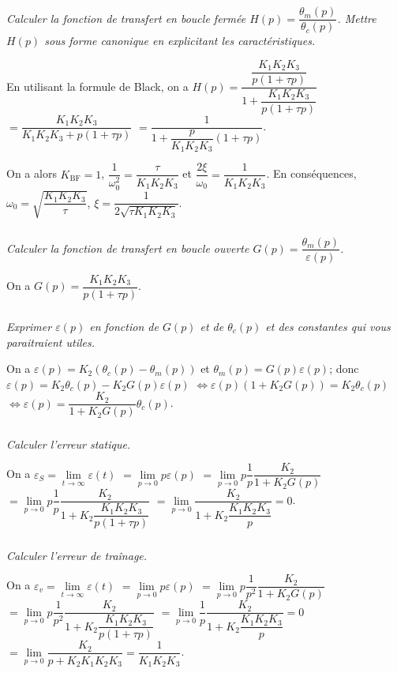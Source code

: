 \documentclass[10pt,fleqn]{article} %
\begin{document}
\subparagraph{\label{q}}\textit{Calculer la fonction de transfert en boucle fermée $H(p)=\dfrac{\theta_m(p)}{\theta_c(p)}$. Mettre $H(p)$ sous forme canonique en explicitant les caractéristiques.}
\ifprof
\begin{corrige}
En utilisant la formule de Black, on a 
$H(p)=\dfrac{\dfrac{K_1K_2K_3}{p\left(1+\tau p\right)}}{1+\dfrac{K_1K_2K_3}{p\left(1+\tau p\right)}}$
$=\dfrac{K_1K_2K_3}{K_1K_2K_3+p\left(1+\tau p\right)}$
$=\dfrac{1}{1+\dfrac{p}{K_1K_2K_3}\left(1+\tau p\right)}$.

On a alors $K_{\text{BF}} = 1$, $\dfrac{1}{\omega_0^2}=\dfrac{\tau}{K_1K_2K_3}$ et $ \dfrac{2\xi }{\omega_0}= \dfrac{1}{K_1K_2K_3}$. 
En conséquences, $\omega_0=\sqrt{\dfrac{K_1K_2K_3}{\tau}}$, $\xi = \dfrac{1}{2\sqrt{\tau K_1K_2K_3}}$.
\end{corrige}
\else
\fi


\subparagraph{\label{q}}\textit{Calculer la fonction de transfert en boucle ouverte $G(p)=\dfrac{\theta_m(p)}{\varepsilon(p)}$. }
\ifprof
\begin{corrige}
On a $G(p)=\dfrac{K_1K_2K_3}{p\left(1+\tau p\right)}$.
\end{corrige}
\else
\fi

\subparagraph{\label{q}}\textit{Exprimer $\varepsilon(p)$ en fonction de  $G(p)$ et de $\theta_c(p)$ et des constantes qui vous paraitraient utiles.}
\ifprof
\begin{corrige}
On a $\varepsilon(p) =  K_2 \left(\theta_c(p)-\theta_m(p)\right)$ et $\theta_m(p) =G(p)\varepsilon(p)$; donc 
$\varepsilon(p) =  K_2 \theta_c(p)-K_2 G(p)\varepsilon(p)$
$\Longleftrightarrow \varepsilon(p)(1+K_2G(p)) =  K_2 \theta_c(p)$
$\Longleftrightarrow \varepsilon(p) =\dfrac{K_2}{1+K_2G(p)} \theta_c(p)$.
\end{corrige}
\else
\fi

\subparagraph{\label{q}}\textit{Calculer l'erreur statique.}
\ifprof
\begin{corrige}
On a $\varepsilon_S = \lim\limits_{t\to \infty} \varepsilon(t)$
$= \lim\limits_{p\to 0} p\varepsilon(p)$
$= \lim\limits_{p\to 0} p\dfrac{1}{p}\dfrac{K_2}{1+K_2G(p)}$
$= \lim\limits_{p\to 0} p\dfrac{1}{p}\dfrac{K_2}{1+K_2\dfrac{K_1K_2K_3}{p\left(1+\tau p\right)}}$
$= \lim\limits_{p\to 0}\dfrac{K_2}{1+K_2\dfrac{K_1K_2K_3}{p}}=0$.

\end{corrige}
\else
\fi

\subparagraph{\label{q}}\textit{Calculer l'erreur de traînage.}
\ifprof
\begin{corrige}
On a $\varepsilon_v = \lim\limits_{t\to \infty} \varepsilon(t)$
$= \lim\limits_{p\to 0} p\varepsilon(p)$
$= \lim\limits_{p\to 0} p\dfrac{1}{p^2}\dfrac{K_2}{1+K_2G(p)}$
$= \lim\limits_{p\to 0} p\dfrac{1}{p^2}\dfrac{K_2}{1+K_2\dfrac{K_1K_2K_3}{p\left(1+\tau p\right)}}$
$= \lim\limits_{p\to 0}\dfrac{1}{p} \dfrac{K_2}{1+K_2\dfrac{K_1K_2K_3}{p}}=0$
$= \lim\limits_{p\to 0} \dfrac{K_2}{p+K_2{K_1K_2K_3}}=\dfrac{1}{{K_1K_2K_3}}$.

\end{corrige}
\else
\fi
\end{document}
